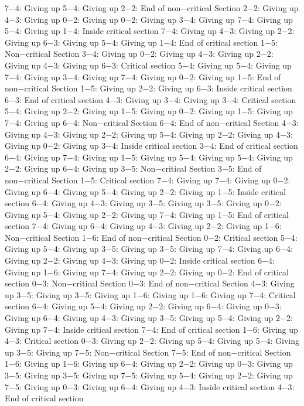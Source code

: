 7−4: Giving up
5−4: Giving up
2−2: End of non−critical Section
2−2: Giving up
4−3: Giving up
0−2: Giving up
0−2: Giving up
3−4: Giving up
7−4: Giving up
5−4: Giving up
1−4: Inside critical section
7−4: Giving up
4−3: Giving up
2−2: Giving up
6−3: Giving up
5−4: Giving up
1−4: End of critical section
1−5: Non−critical Section
3−4: Giving up
0−2: Giving up
4−3: Giving up
2−2: Giving up
4−3: Giving up
6−3: Critical section
5−4: Giving up
5−4: Giving up
7−4: Giving up
3−4: Giving up
7−4: Giving up
0−2: Giving up
1−5: End of non−critical Section
1−5: Giving up
2−2: Giving up
6−3: Inside critical section
6−3: End of critical section
4−3: Giving up
3−4: Giving up
3−4: Critical section
5−4: Giving up
2−2: Giving up
1−5: Giving up
0−2: Giving up
1−5: Giving up
7−4: Giving up
6−4: Non−critical Section
6−4: End of non−critical Section
4−3: Giving up
4−3: Giving up
2−2: Giving up
5−4: Giving up
2−2: Giving up
4−3: Giving up
0−2: Giving up
3−4: Inside critical section
3−4: End of critical section
6−4: Giving up
7−4: Giving up
1−5: Giving up
5−4: Giving up
5−4: Giving up
2−2: Giving up
6−4: Giving up
3−5: Non−critical Section
3−5: End of non−critical Section
1−5: Critical section
7−4: Giving up
7−4: Giving up
0−2: Giving up
6−4: Giving up
5−4: Giving up
2−2: Giving up
1−5: Inside critical section
6−4: Giving up
4−3: Giving up
3−5: Giving up
3−5: Giving up
0−2: Giving up
5−4: Giving up
2−2: Giving up
7−4: Giving up
1−5: End of critical section
7−4: Giving up
6−4: Giving up
4−3: Giving up
2−2: Giving up
1−6: Non−critical Section
1−6: End of non−critical Section
0−2: Critical section
5−4: Giving up
5−4: Giving up
3−5: Giving up
3−5: Giving up
7−4: Giving up
6−4: Giving up
2−2: Giving up
4−3: Giving up
0−2: Inside critical section
6−4: Giving up
1−6: Giving up
7−4: Giving up
2−2: Giving up
0−2: End of critical section
0−3: Non−critical Section
0−3: End of non−critical Section
4−3: Giving up
3−5: Giving up
3−5: Giving up
1−6: Giving up
1−6: Giving up
7−4: Critical section
6−4: Giving up
5−4: Giving up
2−2: Giving up
6−4: Giving up
0−3: Giving up
6−4: Giving up
4−3: Giving up
3−5: Giving up
5−4: Giving up
2−2: Giving up
7−4: Inside critical section
7−4: End of critical section
1−6: Giving up
4−3: Critical section
0−3: Giving up
2−2: Giving up
5−4: Giving up
5−4: Giving up
3−5: Giving up
7−5: Non−critical Section
7−5: End of non−critical Section
1−6: Giving up
1−6: Giving up
6−4: Giving up
2−2: Giving up
0−3: Giving up
3−5: Giving up
3−5: Giving up
7−5: Giving up
5−4: Giving up
2−2: Giving up
7−5: Giving up
0−3: Giving up
6−4: Giving up
4−3: Inside critical section
4−3: End of critical section

